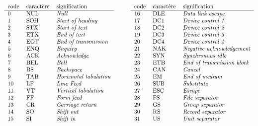\begin{fig}\label{fig:ascii}
\scriptsize
$$\begin{tabular}[t]{lll}
code & caractère & signification \\
\hline
0 & NUL & \em Null\\
1 & SOH & \em Start of heading\\
2 & STX & \em Start of text\\
3 & ETX & \em End of text\\
4 & EOT & \em End of transmission\\
5 & ENQ & \em Enquiry\\
6 & ACK & \em Acknowledge\\
7 & BEL & \em Bell\\
8 & BS  & \em Backspace\\
9 & TAB & \em Horizontal tabulation\\
10 & LF & \em Line Feed\\
11& VT  & \em Vertical tabulation\\
12& FF  & \em Form feed\\
13& CR  & \em Carriage return\\
14& SO  & \em Shift out\\
15& SI  & \em Shift in
\end{tabular}
\hspace*{1cm}
\begin{tabular}[t]{lll}
code & caractère & signification \\
\hline
16& DLE & \em Data link escape\\
17& DC1 & \em Device control 1\\
18& DC2 & \em Device control 2\\
19& DC3 & \em Device control 3\\
20& DC4 & \em Device control 4\\
21& NAK & \em Negative acknowledgement\\
22& SYN & \em Synchronous idle\\
23& ETB & \em End of transmission block\\
24& CAN & \em Cancel\\    
25& EM  & \em End of medium\\
26& SUB & \em Substitute\\
27& ESC & \em Escape\\
28& FS  & \em File separator\\
29& GS  & \em Group separator\\
30& RS  & \em Record separator\\
31& US  & \em Unit separator
\end{tabular}$$
\end{fig}

